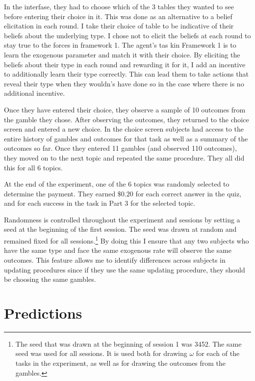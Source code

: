 \documentclass[
  12pt,
]{article}
\begin{document}
In the interfase, they had to choose which of the 3 tables they wanted
to see before entering their choice in it. This was done as an
alternative to a belief elicitation in each round. I take their choice
of table to be indicative of their beliefs about the underlying type. I
chose not to elicit the beliefs at each round to stay true to the forces
in framework 1. The agent's tas kin Framework 1 is to learn the
exogenous parameter and match it with their choice. By eliciting the
beliefs about their type in each round and rewarding it for it, I add an
incentive to additionally learn their type correctly. This can lead them
to take actions that reveal their type when they wouldn's have done so
in the case where there is no additional incentive.

Once they have entered their choice, they observe a sample of 10
outcomes from the gamble they chose. After observing the outcomes, they
returned to the choice screen and entered a new choice. In the choice
screen subjects had access to the entire history of gambles and outcomes
for that task as well as a summary of the outcomes so far. Once they
entered 11 gambles (and observed 110 outcomes), they moved on to the
next topic and repeated the same procedure. They all did this for all 6
topics.

At the end of the experiment, one of the 6 topics was randomly selected
to determine the payment. They earned \(\$0.20\) for each correct answer
in the quiz, and for each success in the task in Part 3 for the selected
topic.

Randomness is controlled throughout the experiment and sessions by
setting a seed at the beginning of the first session. The seed was drawn
at random and remained fixed for all
sessions.\footnote{The seed that was drawn 
at the beginning of session 1 was 3452. The same seed was used for all sessions. It is used both for drawing $\omega$ for each of 
the tasks in the experiment, as well as for drawing the outcomes from the gambles.}
By doing this I ensure that any two subjects who have the same type and
face the same exogenous rate will observe the same outcomes. This
feature allows me to identify differences across subjects in updating
procedures since if they use the same updating procedure, they should be
choosing the same gambles.

\hypertarget{predictions}{%
\section{Predictions}\label{predictions}}
\end{document}
